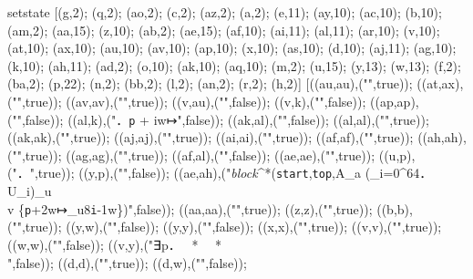 setstate [(g,2); (q,2); (ao,2); (c,2); (az,2); (a,2); (e,11); (ay,10); (ac,10); (b,10); (am,2); (aa,15); (z,10); (ab,2); (ae,15); (af,10); (ai,11); (al,11); (ar,10); (v,10); (at,10); (ax,10); (au,10); (av,10); (ap,10); (x,10); (as,10); (d,10); (aj,11); (ag,10); (k,10); (ah,11); (ad,2); (o,10); (ak,10); (aq,10); (m,2); (u,15); (y,13); (w,13); (f,2); (ba,2); (p,22); (n,2); (bb,2); (l,2); (an,2); (r,2); (h,2)] [((au,au),("",true)); ((at,ax),("",true)); ((av,av),("",true)); ((v,au),("",false)); ((v,k),("",false)); ((ap,ap),("",false)); ((al,k),("．{\tt p} + i{\sf w}↦\underscore",false)); ((ak,al),("",false)); ((al,al),("",true)); ((ak,ak),("",true)); ((aj,aj),("",true)); ((ai,ai),("",true)); ((af,af),("",true)); ((ah,ah),("",true)); ((ag,ag),("",true)); ((af,al),("",false)); ((ae,ae),("",true)); ((u,p),("．",true)); ((y,p),("",false)); ((ae,ah),("\emph{block}^*({\tt start},{\tt top},A_{\sf a} \uplus (\biguplus_{i=0}^{64}．U_i)_{\sf u} {}\\{} \uplus v \uplus \{{\tt p}+2{\sf w}↦_{\sf u}8{\tt i}-1{\sf w}\})",false)); ((aa,aa),("",true)); ((z,z),("",true)); ((b,b),("",true)); ((y,w),("",false)); ((y,y),("",false)); ((x,x),("",true)); ((v,v),("",true)); ((w,w),("",false)); ((v,y),("∃p．  *    *  {}\\{} ",false)); ((d,d),("",true)); ((d,w),("",false)); 